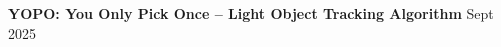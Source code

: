 \documentclass[a4paper,11pt]{article}
\newcommand{\MYhref}[3][black]{\href{#2}{\color{#1}{#3}}}%
\begin{document}







\textbf{YOPO: You Only Pick Once -- Light Object Tracking Algorithm} \hfill Sept 2025
\end{document}
